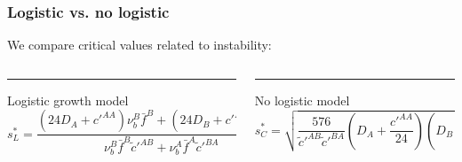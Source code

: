 \documentclass[10pt]{beamer}
\newcommand\eps{\varepsilon}
\def \a {{\alpha}}
\def \b {{\beta}}
\def \g {{\gamma}}
\def \d {{\delta}}
\def \bfA {{\bar{f}^A}}
\theoremstyle{remark}
\newcommand\Fontv{\fontsize{7}{7.2}\selectfont}
\begin{document}
\begin{frame}
\frametitle{Logistic vs. no logistic}
We compare critical values related to instability:
\vspace{0.3cm}
\Fontv
\begin{columns}[T] %
	\begin{column}{.50\textwidth}
		\color{blue}\rule{\linewidth}{2pt}
		Logistic growth model
		$$s_{L}^{*}=\frac{(24 D_A+c'^{AA})\nu_{b}^{B}\bar{f}^{B}+(24 D_B+c'^{BB})\nu_{b}^{A}\bar{f}^A}{\nu_{b}^{B}\bar{f}^B\tilde{c}'^{AB}+\nu_{b}^{A}\bar{f}^A\tilde{c}'^{BA}}, $$
	

		
	\end{column}%
	\hfill%
	\begin{column}{.50\textwidth}
		\color{blue}\rule{\linewidth}{2pt}
		No logistic model
		$$ s^{*}_{C}= \sqrt{\frac{576}{\tilde{c}'^{AB} \tilde{c}'^{BA}} \left( D_A+\frac{c'^{AA}}{24} \right) \left(D_B+\frac{c'^{BB}}{24} \right) } $$
		
		
	\end{column}%
\end{columns}

%	






\begin{figure}


\end{figure}
\end{frame}
\end{document}
